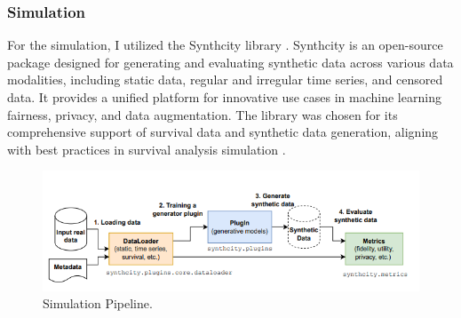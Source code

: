 \subsubsection*{Simulation}
For the simulation, I utilized the Synthcity library \parencite{qian_synthcity_2023}. Synthcity is an open-source package designed for generating and evaluating synthetic data across various data modalities, including static data, regular and irregular time series, and censored data. It provides a unified platform for innovative use cases in machine learning fairness, privacy, and data augmentation. The library was chosen for its comprehensive support of survival data and synthetic data generation, aligning with best practices in survival analysis simulation \parencite{norcliffe_survivalgan_2023, thurow_how_2023}.
\begin{figure}[h]
    \centering
    \includegraphics[width=\linewidth]{Figures/SynthCity.png}
    \caption{\parencite{qian_synthcity_2023} Simulation Pipeline.}
\end{figure}

